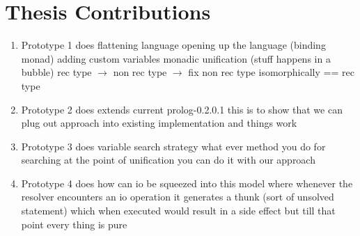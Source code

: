 \documentclass[thesis-solanki.tex]{subfiles}
\begin{document}
\section{Thesis Contributions}

\begin{enumerate}
\item Prototype 1 does 
flattening language
opening up the language (binding monad)
adding custom variables
monadic unification (stuff happens in a bubble)
rec type $\rightarrow$ non rec type $\rightarrow$ fix non rec type isomorphically == rec type




\item Prototype 2 does
extends current prolog-0.2.0.1
this is to show that we can plug out approach into existing implementation and things work

\item Prototype 3 does
variable search strategy
what ever method you do for searching at the point of unification you can do it with our approach

\item Prototype 4 does
how can io be squeezed into this model where whenever the resolver encounters an io operation it generates a thunk (sort of unsolved 
statement) which when executed would result in a side effect but till that point every thing is pure

\end{enumerate}
\end{document}
